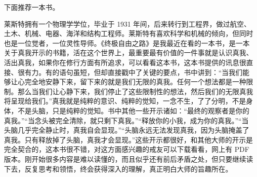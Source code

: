 下面推荐一本书。

\begin{book}
    莱斯特拥有一个物理学学位，毕业于 1931 年间，后来转行到工程界，做过航空、土木、机械、电器、海洋和结构工程师。莱斯特有喜欢科学和机械的倾向，但同时也是一位觉者，一位灵性导师。《终极自由之路》是我最近在看的一本书，是一本关于真我开示的书籍，活在这个世界上，最重要最有价值的一件事就是认识真我、活出真我，如果你在修行方面有所追求，可以看看这本书，这本书提供的讯息很直接、很有力。有的语句虽短，但却直接戳中了关键的要点，书中讲到：“当我们能够让心完全地安静下来，留下来的就是我们无限的真我。任何一个想法都是一种限制。那么当我们让心静下来，我们停止了这些限制性的想法，然后我们的无限真我将呈现给我们。”真我就是纯粹的意识、纯粹的觉知，一念不生，了了分明，不是身体，不是头脑，只是纯粹的觉知。书中其他一些开示诸如：“最终的观察者是你的真我。”“当念头被完全清除，就只剩下真我。”“释放你的小我，成为你的真我。”“当头脑几乎完全静止时，真我自会显现。”“头脑永远无法发现真我，因为头脑掩盖了真我。只有释放掉了头脑，真我才会显现。”这些开示都很好，和其他大师的开示是完全契合的，这本书很不错，对这方面感兴趣的戒友可以下载看看，网上有 PDF 版本。刚开始很多内容是难以读懂的，而且似乎还有前后矛盾之处，但只要继续读下去，反复思考和领悟，终会获得深入的理解，真正明白大师的旨趣所在。
\end{book}
